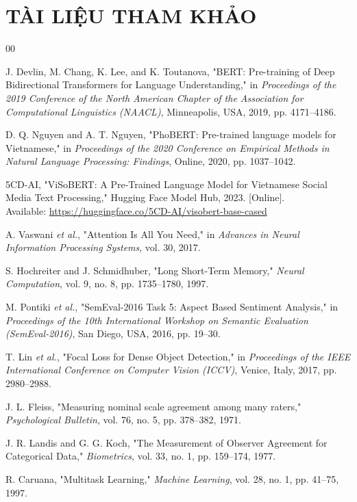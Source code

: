 \clearpage
\section*{TÀI LIỆU THAM KHẢO}
\begin{thebibliography}{00}

J. Devlin, M. Chang, K. Lee, and K. Toutanova, "BERT: Pre-training of Deep Bidirectional Transformers for Language Understanding," in \textit{Proceedings of the 2019 Conference of the North American Chapter of the Association for Computational Linguistics (NAACL)}, Minneapolis, USA, 2019, pp. 4171--4186.

D. Q. Nguyen and A. T. Nguyen, "PhoBERT: Pre-trained language models for Vietnamese," in \textit{Proceedings of the 2020 Conference on Empirical Methods in Natural Language Processing: Findings}, Online, 2020, pp. 1037--1042.

5CD-AI, "ViSoBERT: A Pre-Trained Language Model for Vietnamese Social Media Text Processing," Hugging Face Model Hub, 2023. [Online].\\
Available: \url{https://huggingface.co/5CD-AI/visobert-base-cased}

A. Vaswani \textit{et al.}, "Attention Is All You Need," in \textit{Advances in Neural Information Processing Systems}, vol. 30, 2017.

S. Hochreiter and J. Schmidhuber, "Long Short-Term Memory," \textit{Neural Computation}, vol. 9, no. 8, pp. 1735--1780, 1997.

M. Pontiki \textit{et al.}, "SemEval-2016 Task 5: Aspect Based Sentiment Analysis," in \textit{Proceedings of the 10th International Workshop on Semantic Evaluation (SemEval-2016)}, San Diego, USA, 2016, pp. 19--30.

T. Lin \textit{et al.}, "Focal Loss for Dense Object Detection," in \textit{Proceedings of the IEEE International Conference on Computer Vision (ICCV)}, Venice, Italy, 2017, pp. 2980--2988.

J. L. Fleiss, "Measuring nominal scale agreement among many raters," \textit{Psychological Bulletin}, vol. 76, no. 5, pp. 378--382, 1971.

J. R. Landis and G. G. Koch, "The Measurement of Observer Agreement for Categorical Data," \textit{Biometrics}, vol. 33, no. 1, pp. 159--174, 1977.

R. Caruana, "Multitask Learning," \textit{Machine Learning}, vol. 28, no. 1, pp. 41--75, 1997.

\end{thebibliography}
